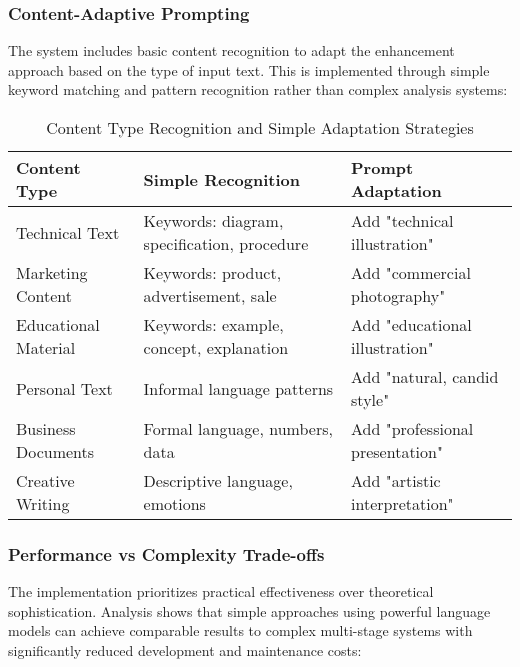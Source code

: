 \begin{table}[H]
\begin{table}[H]
\subsubsection{Content-Adaptive Prompting}

The system includes basic content recognition to adapt the enhancement approach based on the type of input text. This is implemented through simple keyword matching and pattern recognition rather than complex analysis systems:

\begin{table}[H]
\centering
\caption{Content Type Recognition and Simple Adaptation Strategies}
\label{tab:content_types}
{\begin{tabular}{lll}
\toprule
\textbf{Content Type} & \textbf{Simple Recognition} & \textbf{Prompt Adaptation} \\
\midrule
Technical Text & Keywords: diagram, specification, procedure & Add "technical illustration" \\
Marketing Content & Keywords: product, advertisement, sale & Add "commercial photography" \\
Educational Material & Keywords: example, concept, explanation & Add "educational illustration" \\
Personal Text & Informal language patterns & Add "natural, candid style" \\
Business Documents & Formal language, numbers, data & Add "professional presentation" \\
Creative Writing & Descriptive language, emotions & Add "artistic interpretation" \\
\bottomrule
\end{tabular}}
\end{table}

\subsubsection{Performance vs Complexity Trade-offs}

The implementation prioritizes practical effectiveness over theoretical sophistication. Analysis shows that simple approaches using powerful language models can achieve comparable results to complex multi-stage systems with significantly reduced development and maintenance costs:


\end{table}
\end{table}
